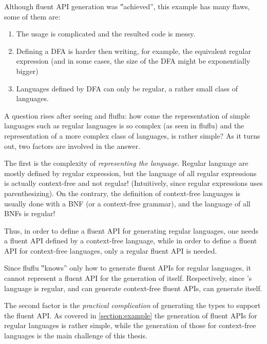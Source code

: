 Although fluent API generation was ‟achieved”, this example has many flaws, some of them are:

\begin{enumerate}
  \item The usage is complicated and the resulted code is messy.
  \item Defining a DFA is harder then writing, for example, the equivalent regular
        expression (and in some cases, the size of the DFA might be exponentially bigger)
  \item Languages defined by DFA can only be regular, a rather small
        class of languages.
\end{enumerate}

A question rises after seeing \Fajita and fluflu: how come the representation
of simple languages such as regular languages is so complex (as seen in fluflu)
and the representation of a more complex class of languages, is rather simple?
As it turns out, two factors are involved in the answer.

The first is the complexity of \emph{representing the language}.
Regular language are mostly defined by regular expression, but the language of
all regular expressions is actually context-free and not regular!
(Intuitively, since regular expressions uses parenthesizing). On the contrary,
the definition of context-free languages is usually done with a BNF (or a
context-free grammar), and the language of all BNFs is regular!

Thus, in order to define a fluent API for generating regular languages, one needs a
fluent API defined by a context-free language, while in order to define a fluent API for
context-free languages, only a regular fluent API is needed.

Since fluflu ‟knows” only how to generate fluent APIs for regular languages,
it cannot represent a fluent API for the generation of itself.
Respectively, since \Fajita's language is regular, and can generate context-free
  fluent APIs, \Fajita can generate itself.

The second factor is the \emph{practical complication} of generating the \Java types to
support the fluent API. As covered in \cref{section:example} the generation of
fluent APIs for regular languages is rather simple, while the generation of
those for context-free languages is the main challenge of this thesis.

